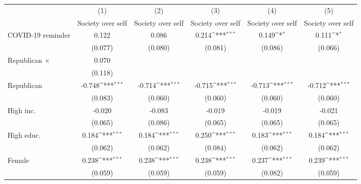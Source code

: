 {
\def\sym#1{\ifmmode^{#1}\else\(^{#1}\)\fi}
\begin{tabular}{l*{5}{c}}
\toprule
                    &\multicolumn{1}{c}{(1)}&\multicolumn{1}{c}{(2)}&\multicolumn{1}{c}{(3)}&\multicolumn{1}{c}{(4)}&\multicolumn{1}{c}{(5)}\\
                    &\multicolumn{1}{c}{Society over self}&\multicolumn{1}{c}{Society over self}&\multicolumn{1}{c}{Society over self}&\multicolumn{1}{c}{Society over self}&\multicolumn{1}{c}{Society over self}\\
\midrule
COVID-19 reminder   &       0.122         &       0.086         &       0.214\sym{***}&       0.149\sym{*}  &       0.111\sym{*}  \\
                    &     (0.077)         &     (0.080)         &     (0.081)         &     (0.086)         &     (0.066)         \\
\addlinespace
Republican $\times$ &       0.070         &                     &                     &                     &                     \\
                    &     (0.118)         &                     &                     &                     &                     \\
\addlinespace
Republican          &      -0.748\sym{***}&      -0.714\sym{***}&      -0.715\sym{***}&      -0.713\sym{***}&      -0.712\sym{***}\\
                    &     (0.083)         &     (0.060)         &     (0.060)         &     (0.060)         &     (0.060)         \\
\addlinespace
High inc.           &      -0.020         &      -0.083         &      -0.019         &      -0.019         &      -0.021         \\
                    &     (0.065)         &     (0.086)         &     (0.065)         &     (0.065)         &     (0.065)         \\
\addlinespace
High educ.          &       0.184\sym{***}&       0.184\sym{***}&       0.250\sym{***}&       0.183\sym{***}&       0.184\sym{***}\\
                    &     (0.062)         &     (0.062)         &     (0.084)         &     (0.062)         &     (0.062)         \\
\addlinespace
Female              &       0.238\sym{***}&       0.238\sym{***}&       0.238\sym{***}&       0.237\sym{***}&       0.239\sym{***}\\
                    &     (0.059)         &     (0.059)         &     (0.059)         &     (0.082)         &     (0.059)         \\

\end{tabular}}
